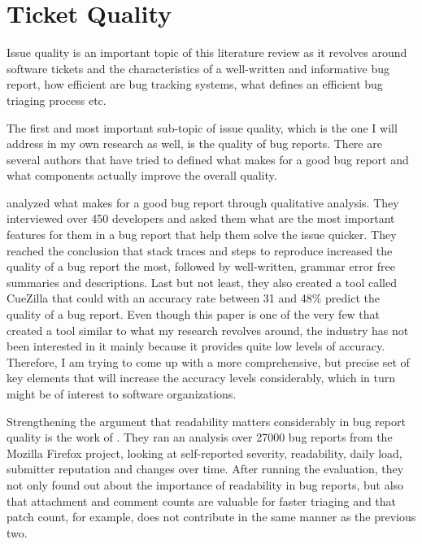 \documentclass[11pt,english,twocolumn]{article}
\begin{document}
\section{Ticket Quality}
\label{sec:ticket-quality}

Issue quality is an important topic of this literature review as it revolves around
software tickets and the characteristics of a well-written and 
informative bug report, how efficient are bug tracking systems, what defines
an efficient bug triaging process etc. 

The first and most important sub-topic of issue quality, which is the one
I will address in my own research as well, is the quality of bug reports.
There are several authors that have tried to defined what makes for a good bug
report and what components actually improve the overall quality.

\cite{bettenburg2008makes} analyzed what 
makes for a good bug report through qualitative analysis. They interviewed over
450 developers and asked them what are the most important features for them in
a bug report that help them solve the issue quicker. They reached the conclusion 
that stack traces and steps to reproduce increased the quality of a bug report 
the most, followed by well-written, grammar error free summaries and 
descriptions. Last but not least, they also created a tool called CueZilla that 
could with an accuracy rate between 31 and 48\% predict the quality of a bug 
report. Even though this paper is one of the very few that created a tool
similar to what my research revolves around, the industry has not been interested
in it mainly because it provides quite low levels of accuracy. Therefore, I am trying
to come up with a more comprehensive, but precise set of key elements that will increase the accuracy
levels considerably, which in turn might be of interest to software organizations.

Strengthening the argument that readability matters considerably in bug report 
quality is the work of \cite{hooimeijer2007modeling}. They ran an analysis over
27000 bug reports from the Mozilla Firefox project, looking at self-reported 
severity, readability, daily load, submitter reputation and changes over time. 
After running the evaluation, they not only found out about the importance of
readability in bug reports, but also that attachment and comment counts are 
valuable for faster triaging and that patch count, for example, does not
contribute in the same manner as the previous two.
\end{document}
